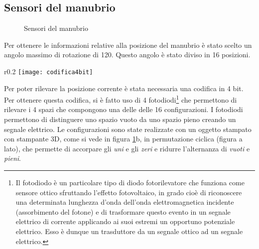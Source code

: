 \subsection{Sensori del manubrio}
\begin{figure}%
    \centering
    \caption{Sensori del manubrio}%
    \label{manubrio}
\end{figure}
Per ottenere le informazioni relative alla posizione del manubrio è stato scelto un angolo massimo di rotazione di 120\degree. Questo angolo è stato diviso in 16 posizioni. \\
\begin{wrapfigure}{r}{0.2\textwidth} %
    \centering
    \vspace{-1.5cm}
    \texttt{[image: codifica4bit]}
\end{wrapfigure}
Per poter rilevare la posizione corrente è stata necessaria una codifica in 4 bit. Per ottenere questa codifica, si è fatto uso di 4 fotodiodi\footnote{Il fotodiodo è un particolare tipo di diodo fotorilevatore che funziona come sensore ottico sfruttando l'effetto fotovoltaico, in grado cioè di riconoscere una determinata lunghezza d'onda dell'onda elettromagnetica incidente (assorbimento del fotone) e di trasformare questo evento in un segnale elettrico di corrente applicando ai suoi estremi un opportuno potenziale elettrico. Esso è dunque un trasduttore da un segnale ottico ad un segnale elettrico.} che permettono di rilevare i 4 spazi che compongono una delle delle 16 configurazioni. I fotodiodi permettono di distinguere uno spazio vuoto da uno spazio pieno creando un segnale elettrico. Le configurazioni sono state realizzate con un oggetto stampato con stampante 3D, come si vede in figura \ref{manubrio}b, in permutazione ciclica (figura a lato), che permette di accorpare gli \textit{uni} e gli \textit{zeri} e ridurre l'alternanza di \textit{vuoti} e \textit{pieni}.


